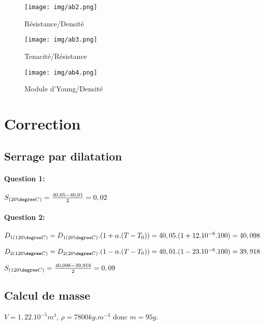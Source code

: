 \begin{figure}[!h] 
  \centering\texttt{[image: img/ab2.png]}
  \caption{Résistance/Densité}
  \label{img:image7}
\end{figure}

\begin{figure}[!h] 
  \centering\texttt{[image: img/ab3.png]}
  \caption{Tenacité/Résistance}
  \label{img:image8}
\end{figure}

\begin{figure}[!ht] 
  \centering\texttt{[image: img/ab4.png]}
  \caption{Module d'Young/Densité}
  \label{img:image9}
\end{figure}

\ifdef{\public}{}{}

\cleardoublepage

\pagestyle{correction}

\newpage

\section{Correction}

\subsection{Serrage par dilatation}

\paragraph{Question 1:} $S_{(20\degree C)}=\frac{40,05-40,01}{2}=0,02$

\paragraph{Question 2:} $D_{1(120\degree C)}=D_{1(20\degree C)}.(1+\alpha.(T-T_0))=40,05.(1+12.10^{-6}.100)=40,098$

$D_{2(120\degree C)}=D_{2(20\degree C)}.(1-\alpha.(T-T_0))=40,01.(1-23.10^{-6}.100)=39,918$

$S_{(120\degree C)}=\frac{40,098-39,918}{2}=0,09$

\subsection{Calcul de masse}

$V=1,22.10^{-5}m^3$, $\rho=7800kg.m^{-3}$ donc $m=95g$.

